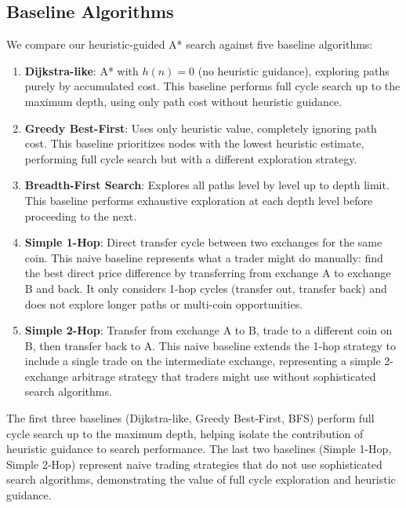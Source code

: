 \documentclass[11pt]{article}
\begin{document}
\subsection{Baseline Algorithms}

We compare our heuristic-guided A* search against five baseline algorithms:

\begin{enumerate}
\item \textbf{Dijkstra-like}: A* with $h(n)=0$ (no heuristic guidance), exploring paths purely by accumulated cost. This baseline performs full cycle search up to the maximum depth, using only path cost without heuristic guidance.

\item \textbf{Greedy Best-First}: Uses only heuristic value, completely ignoring path cost. This baseline prioritizes nodes with the lowest heuristic estimate, performing full cycle search but with a different exploration strategy.

\item \textbf{Breadth-First Search}: Explores all paths level by level up to depth limit. This baseline performs exhaustive exploration at each depth level before proceeding to the next.

\item \textbf{Simple 1-Hop}: Direct transfer cycle between two exchanges for the same coin. This naive baseline represents what a trader might do manually: find the best direct price difference by transferring from exchange A to exchange B and back. It only considers 1-hop cycles (transfer out, transfer back) and does not explore longer paths or multi-coin opportunities.

\item \textbf{Simple 2-Hop}: Transfer from exchange A to B, trade to a different coin on B, then transfer back to A. This naive baseline extends the 1-hop strategy to include a single trade on the intermediate exchange, representing a simple 2-exchange arbitrage strategy that traders might use without sophisticated search algorithms.
\end{enumerate}

The first three baselines (Dijkstra-like, Greedy Best-First, BFS) perform full cycle search up to the maximum depth, helping isolate the contribution of heuristic guidance to search performance. The last two baselines (Simple 1-Hop, Simple 2-Hop) represent naive trading strategies that do not use sophisticated search algorithms, demonstrating the value of full cycle exploration and heuristic guidance.
\end{document}
